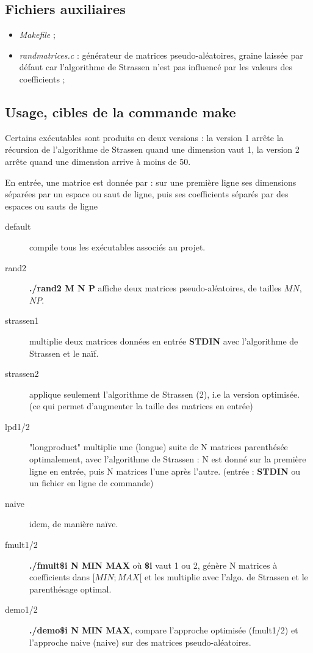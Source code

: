 \documentclass[a4paper]{article}
\begin{document}
\subsection{Fichiers auxiliaires}

\begin{itemize}
  \item {\it Makefile} ;
  \item {\it randmatrices.c} : générateur de matrices pseudo-aléatoires,
  graine laissée par défaut car l'algorithme de Strassen n'est pas
  influencé par les valeurs des coefficients ;
\end{itemize}

\subsection{Usage, cibles de la commande make}

Certains exécutables sont produits en deux versions : la version 1
arrête la récursion de l'algorithme de Strassen
quand une dimension vaut 1, la version 2 arrête quand
une dimension arrive à moins de 50.

En entrée, une matrice est donnée par :
sur une première ligne ses dimensions séparées par un espace ou saut de
ligne, puis ses coefficients séparés par des espaces ou sauts de ligne

\begin{description}
  \item[default] compile tous les exécutables associés au projet.
  \item[rand2] {\bf ./rand2 M N P} affiche deux matrices
  pseudo-aléatoires, de tailles $MN$, $NP$.
  \item[strassen1] multiplie deux matrices données en entrée {\bf STDIN}
  avec l'algorithme de Strassen et le naïf.
  \item[strassen2] applique seulement l'algorithme de Strassen (2), i.e
  la version optimisée.
  (ce qui permet d'augmenter la taille des matrices en entrée)
  \item[lpd1/2] "longproduct" multiplie une (longue) suite de N matrices
  parenthésée optimalement, avec l'algorithme de Strassen :
  N est donné sur la première ligne en entrée, puis N matrices l'une
  après l'autre. (entrée : {\bf STDIN} ou un fichier en ligne de commande)
  \item[naive] idem, de manière naïve.
  \item[fmult1/2] {\bf ./fmult\$i N MIN MAX} où {\bf \$i} vaut 1 ou 2,
  génère N matrices à coefficients dans $[MIN;MAX[$ et les multiplie
  avec l'algo. de Strassen et le parenthésage optimal.
  \item[demo1/2] {\bf ./demo\$i N MIN MAX}, compare l'approche optimisée
  (fmult1/2) et l'approche naive (naive) sur des matrices
  pseudo-aléatoires.
\end{description}
	
\end{document}
